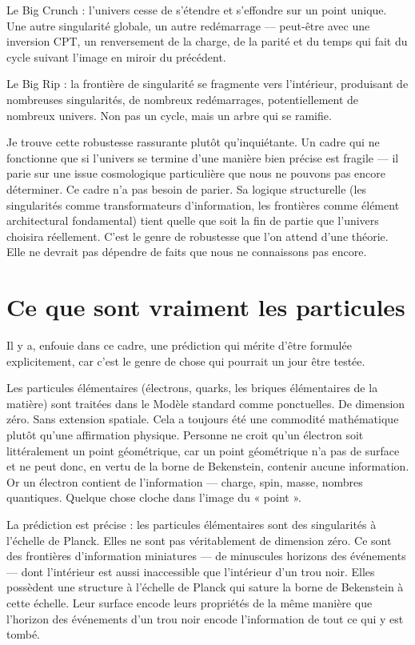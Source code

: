 \documentclass[11pt, twoside, openright]{book}
\begin{document}
Le Big Crunch : l'univers cesse de s'étendre et s'effondre sur un point unique. Une autre singularité globale, un autre redémarrage --- peut-être avec une inversion CPT, un renversement de la charge, de la parité et du temps qui fait du cycle suivant l'image en miroir du précédent.

Le Big Rip : la frontière de singularité se fragmente vers l'intérieur, produisant de nombreuses singularités, de nombreux redémarrages, potentiellement de nombreux univers. Non pas un cycle, mais un arbre qui se ramifie.

Je trouve cette robustesse rassurante plutôt qu'inquiétante. Un cadre qui ne fonctionne que si l'univers se termine d'une manière bien précise est fragile --- il parie sur une issue cosmologique particulière que nous ne pouvons pas encore déterminer. Ce cadre n'a pas besoin de parier. Sa logique structurelle (les singularités comme transformateurs d'information, les frontières comme élément architectural fondamental) tient quelle que soit la fin de partie que l'univers choisira réellement. C'est le genre de robustesse que l'on attend d'une théorie. Elle ne devrait pas dépendre de faits que nous ne connaissons pas encore.


\section*{Ce que sont vraiment les particules}

Il y a, enfouie dans ce cadre, une prédiction qui mérite d'être formulée explicitement, car c'est le genre de chose qui pourrait un jour être testée.

Les particules élémentaires (électrons, quarks, les briques élémentaires de la matière) sont traitées dans le Modèle standard comme ponctuelles. De dimension zéro. Sans extension spatiale. Cela a toujours été une commodité mathématique plutôt qu'une affirmation physique. Personne ne croit qu'un électron soit littéralement un point géométrique, car un point géométrique n'a pas de surface et ne peut donc, en vertu de la borne de Bekenstein, contenir aucune information. Or un électron contient de l'information --- charge, spin, masse, nombres quantiques. Quelque chose cloche dans l'image du « point ».

La prédiction est précise : les particules élémentaires sont des singularités à l'échelle de Planck. Elles ne sont pas véritablement de dimension zéro. Ce sont des frontières d'information miniatures --- de minuscules horizons des événements --- dont l'intérieur est aussi inaccessible que l'intérieur d'un trou noir. Elles possèdent une structure à l'échelle de Planck qui sature la borne de Bekenstein à cette échelle. Leur surface encode leurs propriétés de la même manière que l'horizon des événements d'un trou noir encode l'information de tout ce qui y est tombé.
\end{document}
